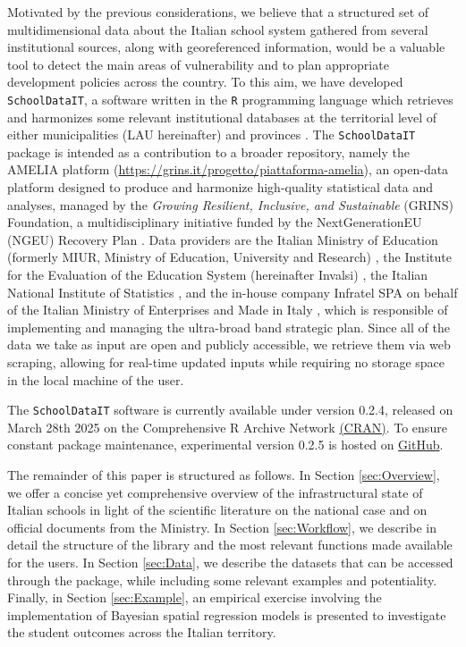 \documentclass{article}%
\begin{document}
Motivated by the previous considerations, we believe that a structured set of multidimensional data about the Italian school system gathered from several institutional sources, along with georeferenced information, would be a valuable tool to detect the main areas of vulnerability and to plan appropriate development policies across the country. To this aim, we have developed \texttt{SchoolDataIT}, a software written in the \texttt{R} programming language \citep{R} which retrieves and harmonizes some relevant institutional databases at the territorial level of either municipalities (LAU hereinafter) and provinces \citep[NUTS-3 henceforth, ][]{NUTS2024}. 
The \texttt{SchoolDataIT} package is intended as a contribution to a broader repository, namely the AMELIA platform (\url{https://grins.it/progetto/piattaforma-amelia}), an open-data platform designed to produce and harmonize high-quality statistical data and analyses, managed by the \textit{Growing Resilient, Inclusive, and Sustainable} (GRINS) Foundation, a multidisciplinary initiative funded by the NextGenerationEU (NGEU) Recovery Plan \citep{CrescenziEtAl2021, DeLaPorteJensen2021}. 
Data providers are the Italian Ministry of Education (formerly MIUR, Ministry of Education, University and Research) \citep{MIUR}, the Institute for the Evaluation of the Education System (hereinafter Invalsi) \citep{Invalsi_IS}, the Italian National Institute of Statistics \citep[ISTAT,][]{InnerAreas, Situas, Shapefiles}, and the in-house company Infratel SPA on behalf of the Italian Ministry of Enterprises and Made in Italy \citep[MIMIT,][]{BB}, which is responsible of implementing and managing the ultra-broad band strategic plan. Since all of the data we take as input are open and publicly accessible, we retrieve them via web scraping, allowing for real-time updated inputs while requiring no storage space in the local machine of the user.

The \texttt{SchoolDataIT} software is currently available under version 0.2.4, released on March 28th 2025 on the Comprehensive R Archive Network \href{https://cran.r-project.org/web/packages/SchoolDataIT/index.html}{(CRAN)}. To ensure constant package maintenance, experimental version 0.2.5 is hosted on \href{https://github.com/lcef97/SchoolDataIT}{GitHub}.

The remainder of this paper is structured as follows. In Section \ref{sec:Overview}, we offer a concise yet comprehensive overview of the infrastructural state of Italian schools in light of the scientific literature on the national case and on official documents from the Ministry. In Section \ref{sec:Workflow}, we describe in detail the structure of the library and the most relevant functions made available for the users. In Section \ref{sec:Data}, we describe the datasets that can be accessed through the package, while including some relevant examples and potentiality. Finally, in Section \ref{sec:Example}, an empirical exercise involving the implementation of Bayesian spatial regression models is presented to investigate the student outcomes across the Italian territory.
\end{document}
